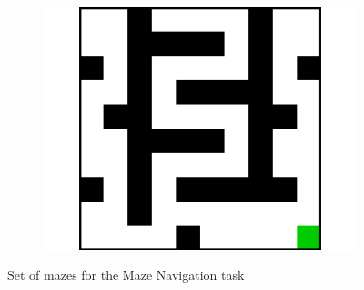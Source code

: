 \documentclass{article}
\begin{document}
\begin{figure}[t]
\begin{subfigure}[t]{0.18\textwidth}
    \includegraphics[width=\textwidth]{images/maze/maze19.pdf}
    \caption{}
  \end{subfigure}
  \caption{Set of mazes for the Maze Navigation task}
  \label{fig:mazes}
\end{figure}
\end{document}
